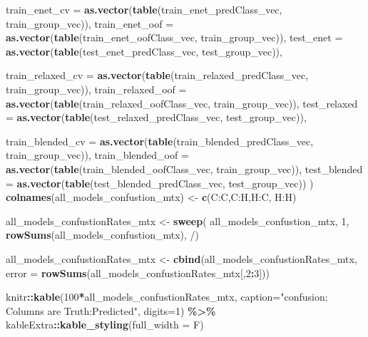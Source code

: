 \documentclass[
]{book}
\newenvironment{Shaded}{\begin{snugshade}}{\end{snugshade}}
\newcommand{\DataTypeTok}[1]{\textcolor[rgb]{0.13,0.29,0.53}{#1}}
\newcommand{\DecValTok}[1]{\textcolor[rgb]{0.00,0.00,0.81}{#1}}
\newcommand{\KeywordTok}[1]{\textcolor[rgb]{0.13,0.29,0.53}{\textbf{#1}}}
\newcommand{\NormalTok}[1]{#1}
\newcommand{\OperatorTok}[1]{\textcolor[rgb]{0.81,0.36,0.00}{\textbf{#1}}}
\newcommand{\StringTok}[1]{\textcolor[rgb]{0.31,0.60,0.02}{#1}}
\begin{document}
\begin{Shaded}
\begin{Highlighting}[]
 \DataTypeTok{train\_enet\_cv =} \KeywordTok{as.vector}\NormalTok{(}\KeywordTok{table}\NormalTok{(train\_enet\_predClass\_vec, train\_group\_vec)),}
 \DataTypeTok{train\_enet\_oof =} \KeywordTok{as.vector}\NormalTok{(}\KeywordTok{table}\NormalTok{(train\_enet\_oofClass\_vec, train\_group\_vec)),}
 \DataTypeTok{test\_enet =} \KeywordTok{as.vector}\NormalTok{(}\KeywordTok{table}\NormalTok{(test\_enet\_predClass\_vec, test\_group\_vec)),}

 \DataTypeTok{train\_relaxed\_cv =} \KeywordTok{as.vector}\NormalTok{(}\KeywordTok{table}\NormalTok{(train\_relaxed\_predClass\_vec, train\_group\_vec)),}
 \DataTypeTok{train\_relaxed\_oof =} \KeywordTok{as.vector}\NormalTok{(}\KeywordTok{table}\NormalTok{(train\_relaxed\_oofClass\_vec, train\_group\_vec)),}
 \DataTypeTok{test\_relaxed =} \KeywordTok{as.vector}\NormalTok{(}\KeywordTok{table}\NormalTok{(test\_relaxed\_predClass\_vec, test\_group\_vec)),}

 \DataTypeTok{train\_blended\_cv =} \KeywordTok{as.vector}\NormalTok{(}\KeywordTok{table}\NormalTok{(train\_blended\_predClass\_vec, train\_group\_vec)),}
 \DataTypeTok{train\_blended\_oof =} \KeywordTok{as.vector}\NormalTok{(}\KeywordTok{table}\NormalTok{(train\_blended\_oofClass\_vec, train\_group\_vec)),}
 \DataTypeTok{test\_blended =} \KeywordTok{as.vector}\NormalTok{(}\KeywordTok{table}\NormalTok{(test\_blended\_predClass\_vec, test\_group\_vec))}
\NormalTok{)}
\KeywordTok{colnames}\NormalTok{(all\_models\_confustion\_mtx) <{-}}\StringTok{ }\KeywordTok{c}\NormalTok{(}\StringTok{\textquotesingle{}C:C\textquotesingle{}}\NormalTok{,}\StringTok{\textquotesingle{}C:H\textquotesingle{}}\NormalTok{,}\StringTok{\textquotesingle{}H:C\textquotesingle{}}\NormalTok{, }\StringTok{\textquotesingle{}H:H\textquotesingle{}}\NormalTok{)}


\NormalTok{all\_models\_confustionRates\_mtx <{-}}\StringTok{ }\KeywordTok{sweep}\NormalTok{(}
\NormalTok{ all\_models\_confustion\_mtx, }\DecValTok{1}\NormalTok{, }\KeywordTok{rowSums}\NormalTok{(all\_models\_confustion\_mtx), }\StringTok{\textquotesingle{}/\textquotesingle{}}\NormalTok{)}

\NormalTok{all\_models\_confustionRates\_mtx <{-}}\StringTok{ }\KeywordTok{cbind}\NormalTok{(all\_models\_confustionRates\_mtx,}
  \DataTypeTok{error =} \KeywordTok{rowSums}\NormalTok{(all\_models\_confustionRates\_mtx[,}\DecValTok{2}\OperatorTok{:}\DecValTok{3}\NormalTok{]))}

\NormalTok{knitr}\OperatorTok{::}\KeywordTok{kable}\NormalTok{(}\DecValTok{100}\OperatorTok{*}\NormalTok{all\_models\_confustionRates\_mtx, }
  \DataTypeTok{caption=}\StringTok{"confusion: Columns are Truth:Predicted"}\NormalTok{,}
  \DataTypeTok{digits=}\DecValTok{1}\NormalTok{) }\OperatorTok{\%>\%}
\StringTok{  }\NormalTok{kableExtra}\OperatorTok{::}\KeywordTok{kable\_styling}\NormalTok{(}\DataTypeTok{full\_width =}\NormalTok{ F)}
\end{Highlighting}
\end{Shaded}
\end{document}
